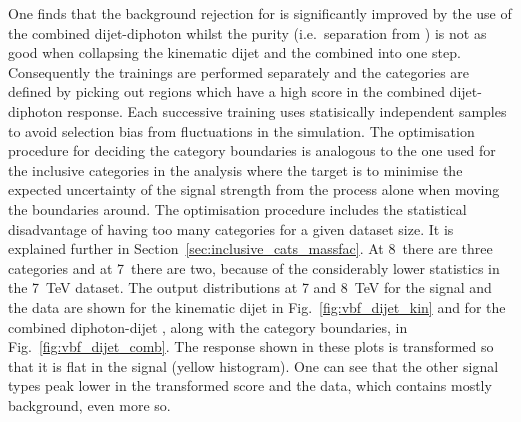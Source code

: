 One finds that the background rejection for \VBF is significantly improved by the use of the combined dijet-diphoton \BDT whilst the \VBF purity (i.e.~separation from \ggH) is not as good when collapsing the kinematic dijet \BDT and the combined \BDT into one step. Consequently the trainings are performed separately and the \VBF categories are defined by picking out regions which have a high score in the combined dijet-diphoton \BDT response. Each successive \BDT training uses statisically independent \MC samples to avoid selection bias from fluctuations in the simulation. The optimisation procedure for deciding the category boundaries is analogous to the one used for the inclusive categories in the \MFM analysis where the target is to minimise the expected uncertainty of the signal strength from the \VBF process alone when moving the boundaries around. The optimisation procedure includes the statistical disadvantage of having too many categories for a given dataset size. It is explained further in Section~\ref{sec:inclusive_cats_massfac}. At 8~\TeV there are three \VBF categories and at 7~\TeV there are two, because of the considerably lower statistics in the 7~TeV dataset. The output distributions at 7 and 8~TeV for the signal and the data are shown for the kinematic dijet \BDT in Fig.~\ref{fig:vbf_dijet_kin} and for the combined diphoton-dijet \BDT, along with the \VBF category boundaries, in Fig.~\ref{fig:vbf_dijet_comb}. The \BDT response shown in these plots is transformed so that it is flat in the \VBF signal (yellow histogram). One can see that the other signal types peak lower in the transformed score and the data, which contains mostly background, even more so. 

